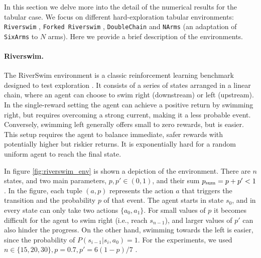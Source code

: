 In this section we delve more into the detail of the numerical results for the tabular case. We focus on different hard-exploration tabular environments: {\tt Riverswim} \cite{strehl2004empirical}, {\tt Forked Riverswim} \cite{russo2023model}, {\tt DoubleChain} \cite{Kaufmann21a} and {\tt NArms} \cite{strehl2004empirical} (an adaptation of {\tt SixArms} to $N$ arms). 
Here we provide a brief description of the environments. 

\paragraph{Riverswim.} 
The RiverSwim environment is a classic reinforcement learning benchmark designed to test exploration \cite{strehl2004empirical}. It consists of a series of states arranged in a linear chain, where an agent can choose to swim right (downstream) or left (upstream). In the single-reward setting the agent can achieve a positive return by swimming right,  but requires overcoming a strong current, making it a less probable event. Conversely, swimming left generally offers small to zero rewards, but is easier. This setup requires the agent to balance immediate, safer rewards with potentially higher but riskier returns. It is exponentially hard for a random uniform agent to reach the final state.

In figure \cref{fig:riverswim_env} is shown a depiction of the environment.  There are $n$ states, and two main parameters, $p,p'\in (0,1)$, and their sum $p_{\rm sum}=p+p'<1$. In the figure, each tuple $(a,p)$ represents the  action $a$ that triggers the transition and the probability $p$ of that event. The agent starts in state $s_0$, and in every state can only take two actions $\{a_0,a_1\}$. For small values of $p$ it becomes difficult for the agent to swim right (i.e., reach $s_{n-1}$), and larger values of $p'$ can also hinder the progress. On the other hand, swimming towards the left is easier, since the probability of $P(s_{i-1}|s_i, a_0)=1$. For the experiments, we used $n\in\{15,20,30\}, p=0.7, p'=6(1 - p)/7$ .



